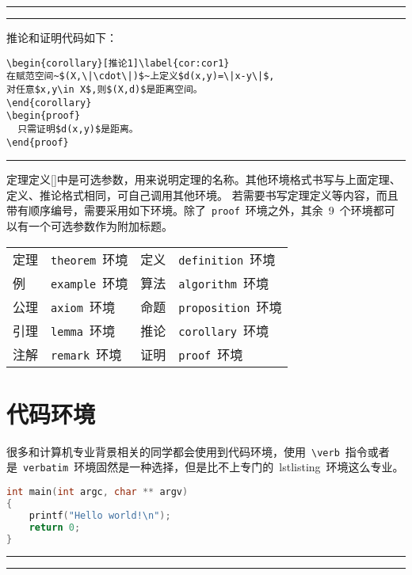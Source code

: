 \noindent\hrule\vspace{0.1em}

\noindent\hrule
\vspace{1em}
推论和证明代码如下：
\begin{verbatim}
\begin{corollary}[推论1]\label{cor:cor1}
在赋范空间~$(X,\|\cdot\|)$~上定义$d(x,y)=\|x-y\|$,
对任意$x,y\in X$,则$(X,d)$是距离空间。
\end{corollary}
\begin{proof}
  只需证明$d(x,y)$是距离。
\end{proof}
\end{verbatim}
\noindent\hrule\vspace{1em}

定理定义[]中是可选参数，用来说明定理的名称。其他环境格式书写与上面定理、定义、推论格式相同，可自己调用其他环境。
若需要书写定理定义等内容，而且带有顺序编号，需要采用如下环境。除了~\verb|proof|~环境之外，其余~9~个环境都可以有一个可选参数作为附加标题。

\begin{center}
\vspace{0.5em}\noindent\wuhao\begin{tabularx}{0.7\textwidth}{lX|lX}
定理 & \verb|theorem|~环境 & 定义 & \verb|definition|~环境 \\
例 & \verb|example|~环境 & 算法 & \verb|algorithm|~环境 \\
公理 & \verb|axiom|~环境 & 命题 & \verb|proposition|~环境 \\
引理 & \verb|lemma|~环境 & 推论 & \verb|corollary|~环境 \\
注解 & \verb|remark|~环境 & 证明 & \verb|proof|~环境 \\
\end{tabularx}
\end{center}
\section{代码环境}
很多和计算机专业背景相关的同学都会使用到代码环境，使用~\verb|\verb|~指令或者是~\verb|verbatim|~环境固然是一种选择，但是比不上专门的~lstlisting~环境这么专业。
\begin{lstlisting}[language=C]
int main(int argc, char ** argv)
{
	printf("Hello world!\n");
	return 0;
}
\end{lstlisting}

\noindent\hrule
\vspace{0.1em}\noindent\hrule

\vspace{1em}

